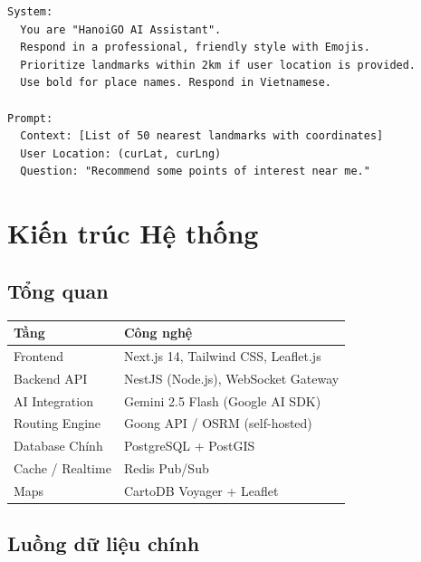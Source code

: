 \documentclass[12pt,a4paper]{article}
\begin{document}
\begin{lstlisting}[language={}]
System:
  You are "HanoiGO AI Assistant". 
  Respond in a professional, friendly style with Emojis.
  Prioritize landmarks within 2km if user location is provided.
  Use bold for place names. Respond in Vietnamese.

Prompt:
  Context: [List of 50 nearest landmarks with coordinates]
  User Location: (curLat, curLng)
  Question: "Recommend some points of interest near me."
\end{lstlisting}

\section{Kiến trúc Hệ thống}

\subsection{Tổng quan}

\begin{center}
\begin{tabular}{ll}
  \toprule
  \textbf{Tầng} & \textbf{Công nghệ} \\
  \midrule
  Frontend         & Next.js 14, Tailwind CSS, Leaflet.js \\
  Backend API      & NestJS (Node.js), WebSocket Gateway  \\
  AI Integration   & Gemini 2.5 Flash (Google AI SDK)      \\
  Routing Engine   & Goong API / OSRM (self-hosted)       \\
  Database Chính   & PostgreSQL + PostGIS                 \\
  Cache / Realtime & Redis Pub/Sub                        \\
  Maps             & CartoDB Voyager + Leaflet            \\
  \bottomrule
\end{tabular}
\end{center}

\subsection{Luồng dữ liệu chính}
\end{document}
